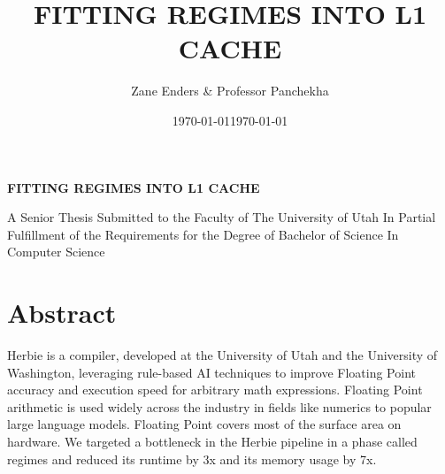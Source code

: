 \documentclass{article}
\title{\uppercase{Fitting Regimes into L1 cache}}
\author{Zane Enders & Professor Panchekha}
\date{\today}
\begin{document}
\begin{titlepage}
    \begin{center}
    

       \vspace*{1cm}

        \textbf{\uppercase{Fitting Regimes into L1 cache}}

       \vspace{0.5cm}
       
       
       \date{\today}
            
       \vspace{1.5cm}

   
        A Senior Thesis Submitted to the Faculty of 
        The University of Utah
        In Partial Fulfillment of the Requirements for the
        Degree of Bachelor of Science
        In
        Computer Science
            
       \vspace{0.8cm}
            
       \vfill
    \end{center}
\end{titlepage}
\newpage


\section{Abstract}
Herbie\cite{Herbie} is a compiler, developed at the University of Utah and the University of Washington,  leveraging rule-based AI techniques to improve Floating Point accuracy and execution speed for arbitrary math expressions. Floating Point arithmetic is used widely across the industry in fields like numerics to popular large language models. Floating Point covers most of the surface area on hardware. We targeted a bottleneck in the Herbie pipeline in a phase called regimes and reduced its runtime by 3x and its memory usage by 7x.
\end{document}
